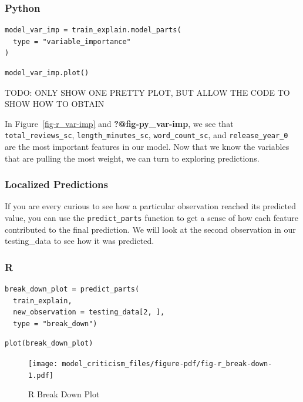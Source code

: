 \documentclass[
  letterpaper,
]{krantz}
\begin{document}
\subsubsection{Python}

\begin{verbatim}
model_var_imp = train_explain.model_parts(
  type = "variable_importance"
)
\end{verbatim}

\begin{verbatim}
model_var_imp.plot()
\end{verbatim}

TODO: ONLY SHOW ONE PRETTY PLOT, BUT ALLOW THE CODE TO SHOW HOW TO
OBTAIN

In Figure~\ref{fig-r_var-imp} and \textbf{?@fig-py\_var-imp}, we see
that \texttt{total\_reviews\_sc}, \texttt{length\_minutes\_sc},
\texttt{word\_count\_sc}, and \texttt{release\_year\_0} are the most
important features in our model. Now that we know the variables that are
pulling the most weight, we can turn to exploring predictions.

\subsubsection{Localized Predictions}\label{localized-predictions}

If you are every curious to see how a particular observation reached its
predicted value, you can use the \texttt{predict\_parts} function to get
a sense of how each feature contributed to the final prediction. We will
look at the second observation in our testing\_data to see how it was
predicted.

\subsubsection{R}

\begin{verbatim}
break_down_plot = predict_parts(
  train_explain, 
  new_observation = testing_data[2, ], 
  type = "break_down")
\end{verbatim}

\begin{verbatim}
plot(break_down_plot)
\end{verbatim}

\begin{figure}[H]

{\centering \texttt{[image: model\_criticism\_files/figure-pdf/fig-r\_break-down-1.pdf]}

}

\caption{\label{fig-r_break-down}R Break Down Plot}

\end{figure}
\end{document}
